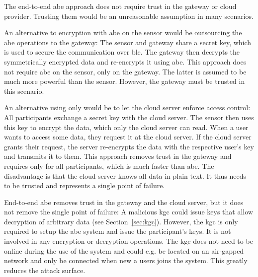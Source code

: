 The end-to-end \acrshort{abe} approach does not require trust in the gateway or cloud provider.
Trusting them would be an unreasonable assumption in many scenarios.

An alternative to encryption with \acrshort{abe} on the sensor would be outsourcing the \acrshort{abe} operations to the gateway:
The sensor and gateway share a secret key, which is used to secure the communication over \acrshort{ble}.
The gateway then decrypts the symmetrically encrypted data and re-encrypts it using \acrshort{abe}.
This approach does not require \acrshort{abe} on the sensor, only on the gateway.
The latter is assumed to be much more powerful than the sensor.
However, the gateway must be trusted in this scenario.

An alternative using only  would be to let the cloud server enforce access control:
All participants exchange a secret key with the cloud server.
The sensor then uses this key to encrypt the data, which only the cloud server can read.
When a user wants to access some data, they request it at the cloud server.
If the cloud server grants their request, the server re-encrypts the data with the respective user's key and transmits it to them.
This approach removes trust in the gateway and requires only  for all participants, which is much faster than \acrshort{abe}.
The disadvantage is that the cloud server knows all data in plain text. It thus needs to be trusted and represents a single point of failure.

End-to-end \acrshort{abe} removes trust in the gateway and the cloud server, but it does not remove the single point of failure:
A malicious \acrfull{kgc} could issue keys that allow decryption of arbitrary data (see Section~\ref{sec:kgc}).
However, the \acrshort{kgc} is only required to setup the \acrshort{abe} system and issue the participant's keys.
It is not involved in any encryption or decryption operations.
The \acrshort{kgc} does not need to be online during the use of the system and could e.g. be located on an air-gapped network and only be connected when new a users joins the system. 
This greatly reduces the attack surface.


